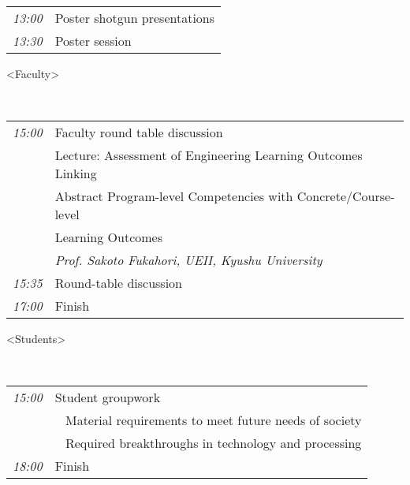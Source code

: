 \noindent\begin{tabu} to \textwidth {|X[1,l]|X[8,l]|}
   \hline
   \hspace{1em}\emph{13:00}   & Poster shotgun presentations \\
    \hspace{1em}\emph{13:30}   & Poster session  \\
   \hline
\end{tabu}


\vspace{3.0em}

\noindent\textless Faculty\textgreater \\

\vspace{-0.15em}

 \\
\noindent\begin{tabu} to \textwidth {|X[1,l]|X[8,l]|}
    \hline
    \hspace{1em}\emph{15:00} & Faculty round table discussion\\
                             & Lecture: Assessment of Engineering Learning Outcomes Linking \\
                             & Abstract Program-level Competencies with Concrete/Course-level \\
                             & Learning Outcomes \\  
                             & \emph{Prof. Sakoto Fukahori,   UEII, Kyushu University} \\
    \hspace{1em}\emph{15:35} & Round-table discussion \\
    \hspace{1em}\emph{17:00} & Finish \\ \hline
\end{tabu}

\vspace{3.0em}

\noindent\textless Students\textgreater\\

\vspace{-0.15em}

 \\
\vspace{1em}
\noindent\begin{tabu} to \textwidth {|X[1,l]|X[8,l]|}
    \hline
    \hspace{1em}\emph{15:00} & Student groupwork \\
            & ~ Material requirements to meet future needs of society \\
            & ~ Required breakthroughs in technology and processing \\
    \hspace{1em}\emph{18:00} & Finish \\ \hline
\end{tabu}


